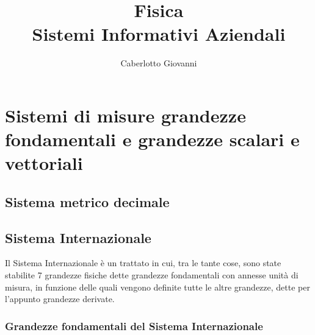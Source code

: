 \documentclass{report}
\title{\Huge{Fisica}\\Sistemi Informativi Aziendali}
\author{\huge{Caberlotto Giovanni}}
\date{}
\begin{document}
\maketitle
\newpage%
\tableofcontents
\pagebreak

\chapter{Sistemi di misure grandezze fondamentali e grandezze scalari e vettoriali} %
\label{chap:Sistemi di misure e grandezze fondamentali e grandezze scalari e vettoriali}

\section{Sistema metrico decimale} %
\label{sec:Sistema metrico decimale}


\section{Sistema Internazionale} %
\label{sec:Sistema Internazionale}
Il Sistema Internazionale è un trattato in cui, tra le tante cose, sono state stabilite 7 grandezze fisiche dette grandezze fondamentali con annesse unità di misura, in funzione delle quali vengono definite tutte le altre grandezze, dette per l'appunto grandezze derivate.

\subsection{Grandezze fondamentali del Sistema Internazionale} %
\label{sub:Grandezze fondamentali del Sistema Internazionale}
\end{document}
